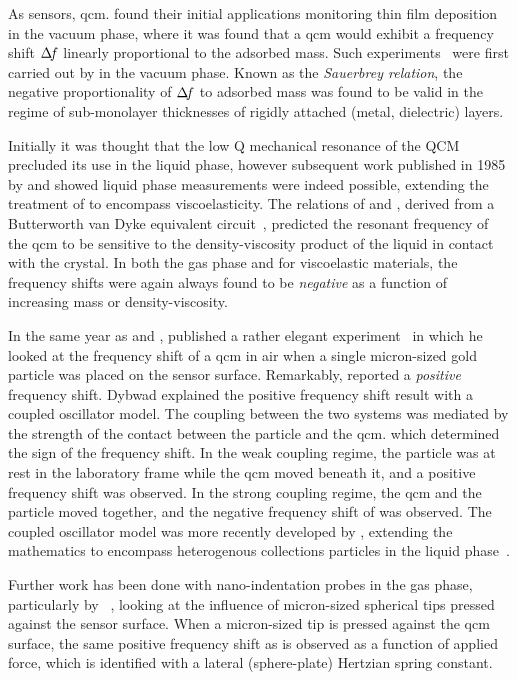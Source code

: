 As sensors, \gls{qcm}. found their initial applications monitoring thin film
deposition in the vacuum phase, where it was found that a \gls{qcm} would exhibit
a frequency shift $\Delta\!f$ linearly proportional to the adsorbed mass.  Such
experiments~\cite{sauerbrey1959verwendung} were first carried out by
 in the vacuum phase.  Known as the \textit{Sauerbrey
  relation}, the negative proportionality of $\Delta\!f$ to adsorbed mass was found
to be valid in the regime of sub-monolayer thicknesses of rigidly attached
(metal, dielectric) layers.

Initially it was thought that the low Q mechanical resonance of the QCM
precluded its use in the liquid phase, however subsequent work published in
1985 by  and  showed liquid phase measurements
were indeed possible, extending the treatment of  to
encompass viscoelasticity.  The relations of  and
, derived from a Butterworth van Dyke equivalent
circuit~\cite{kanazawa1985frequency}, predicted the resonant frequency of
the \gls{qcm} to be sensitive to the density-viscosity product of the liquid in
contact with the crystal.  In both the gas phase and for viscoelastic
materials, the frequency shifts were again always found to be
\textit{negative} as a function of increasing mass or density-viscosity.

In the same year as  and , 
published a rather elegant experiment~\cite{dybwad1985sensitive} in which
he looked at the frequency shift of a \gls{qcm} in air when a single micron-sized
gold particle was placed on the sensor surface.  Remarkably, 
reported a \textit{positive} frequency shift.  Dybwad explained the
positive frequency shift result with a coupled oscillator model.  The
coupling between the two systems was mediated by the strength of the
contact between the particle and the \gls{qcm}. which determined the sign of the
frequency shift.  In the weak coupling regime, the particle was at rest in
the laboratory frame while the \gls{qcm} moved beneath it, and a positive
frequency shift was observed.  In the strong coupling regime, the \gls{qcm} and
the particle moved together, and the negative frequency shift of
 was observed.  The coupled oscillator model was more
recently developed by , extending the mathematics to
encompass heterogenous collections particles in the liquid
phase~\cite{johannsman2007contacts}.

Further work has been done with nano-indentation probes in the gas phase,
particularly by ~\cite{borovsky2001measuring}, looking at
the influence of micron-sized spherical tips pressed against the sensor
surface.  When a micron-sized tip is pressed against the \gls{qcm} surface, the
same positive frequency shift as  is observed as a function of
applied force, which is identified with a lateral (sphere-plate) Hertzian
spring constant.

